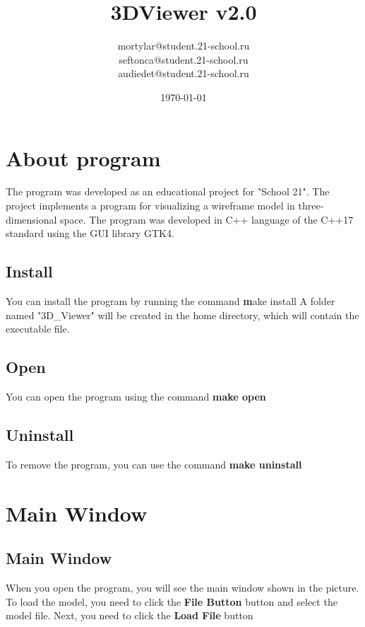 \documentclass[12pt, legalpaper]{report}
\title{3DViewer v2.0}
\author{mortylar@student.21-school.ru \\ seftonca@student.21-school.ru \\ audiedet@student.21-school.ru}
\date{\today}
\begin{document}
\maketitle

\chapter{About program}


The program was developed as an educational project for "School 21".
The project implements a program for visualizing a wireframe model in three-dimensional space.
The program was developed in C++ language of the C++17 standard using the GUI library GTK4.

\section{Install}

You can install the program by running the command 
\textbf make install
A folder named "3D\_{}Viewer" will be created in the home directory, which will contain the executable file.

\section{Open}

You can open the program using the command \textbf{make open}

\section{Uninstall}

To remove the program, you can use the command \textbf{make uninstall}

\newpage

\chapter{Main Window}

\section{Main Window}

When you open the program, you will see the main window shown in the picture.
To load the model, you need to click the \textbf{File Button} button and select the model file.
Next, you need to click the \textbf{Load File} button
\end{document}
